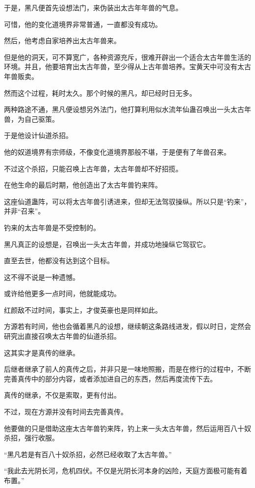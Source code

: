 \begin{this_body}
于是，黑凡便首先设想法门，来伪装出太古年年兽的气息。

可惜，他的变化道境界非常普通，一直都没有成功。

然后，他考虑自家培养出太古年兽来。

但是他的洞天，可不算宽广，各种资源充斥，很难开辟出一个适合太古年兽生活的环境。并且，他要培育出太古年兽，至少得从上古年兽培养。宝黄天中可没有太古年兽贩卖。

然而这个过程，耗时太久。那个时候的黑凡，却已经时日无多。

两种路途不通，黑凡便设想另外法门，他打算利用似水流年仙蛊召唤出一头太古年兽，为自己驱策。

于是他设计仙道杀招。

他的奴道境界有宗师级，不像变化道境界那般不堪，于是便有了年兽召来。

不过这个杀招，只能召唤上古年兽，太古年兽却不好招揽。

在他生命的最后时期，他创造出了太古年兽钓来阵。

这座仙道蛊阵，可以将太古年兽引诱进来，但却无法驾驭操纵。所以只是“钓来”，并非“召来”。

钓来的太古年兽是不受控制的。

黑凡真正的设想是，召唤出一头太古年兽，并成功地操纵它驾驭它。

直至去世，他都没有达到这个目标。

这不得不说是一种遗憾。

或许给他更多一点时间，他就能成功。

红颜敌不过时间，事实上，才俊英豪也是同样如此。

方源若有时间，他也会循着黑凡的设想，继续朝这条路线进发，假以时日，定然会研究出直接召唤太古年兽的仙道杀招。

这其实才是真传的继承。

后继者继承了前人的真传之后，并非只是一味地照搬，而是在修行的过程中，不断完善真传中的部分内容，或者添加进自己的东西，然后再度流传下去。

真传的继承，不仅是索取，更有付出。

不过，现在方源并没有时间去完善真传。

他要做的只是借助这座太古年兽钓来阵，钓上来一头太古年兽，然后运用百八十奴杀招，强行收服。

“黑凡若是有百八十奴杀招，必然已经收取了太古年兽。”

“我此去光阴长河，危机四伏。不仅是光阴长河本身的凶险，天庭方面极可能有着布置。”


\end{this_body}
